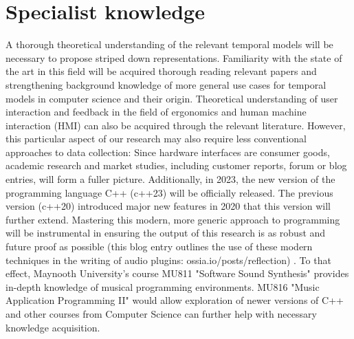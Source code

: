 \documentclass[journal,onecolumn]{IEEEtran}
\begin{document}
\section{Specialist knowledge} %
A thorough theoretical understanding of the relevant temporal models will be necessary to propose striped down representations. Familiarity with the state of the art in this field will be acquired thorough reading relevant papers and strengthening background knowledge of more general use cases for temporal models in computer science and their origin. Theoretical understanding of user interaction and feedback in the field of ergonomics and human machine interaction (HMI) can also be acquired through the relevant literature. However, this particular aspect of our research may also require less conventional approaches to data collection: Since hardware interfaces are consumer goods,  academic research and market studies, including customer reports, forum or blog entries, will form a fuller picture.
Additionally, in 2023, the new version of the programming language C++ (c++23) will be officially released. The previous version (c++20) introduced major new features in 2020 that this version will further extend. Mastering this modern, more generic approach to programming will be instrumental in ensuring the output of this research is as robust and future proof as possible (this blog entry outlines  the use of these modern techniques in the writing of audio plugins: ossia.io/posts/reflection) . To that effect, Maynooth University's course MU811 "Software Sound Synthesis" provides in-depth knowledge of musical programming environments. MU816 "Music Application Programming II" would allow exploration of newer versions of C++ and other courses from Computer Science can further help with necessary knowledge acquisition.
\end{document}
